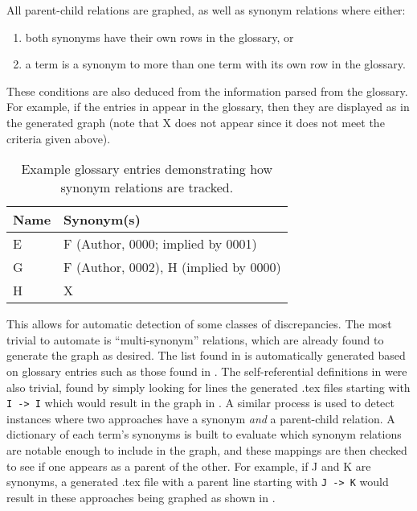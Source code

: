 {        \ExampleGraph{}

    \fi
    All parent-child relations are graphed, as well as synonym relations where either:
    \begin{enumerate}
        \item both synonyms have their own rows in the glossary, or
        \item a term is a synonym to more than one term with its own row in the
              glossary.
    \end{enumerate}
    \ifnotpaper These conditions are also deduced from the information parsed
        from the glossary. For example, if the entries in 
        appear in the glossary, then they are displayed as 
        in the generated graph (note that X does not appear since it does not
        meet the criteria given above).

        \begin{table}[hbtp!]
            \centering
            \begin{tabular}{ll} \hline
                Name & Synonym(s)                            \\ \hline
                E    & F (Author, 0000; implied by 0001)     \\
                G    & F (Author, 0002), H (implied by 0000) \\
                H    & X                                     \\ \hline
            \end{tabular}
            \caption{Example glossary entries demonstrating how synonym relations are tracked.}
            \label{tab:synExampleGlossary}
        \end{table}

        This allows for automatic detection of some classes of discrepancies. The
        most trivial to automate is ``multi-synonym'' relations, which are already
        found to generate the graph as desired. The list found in 
        is automatically generated based on glossary entries such as those found
        in . The self-referential definitions in
         were also trivial, found by simply looking for lines
        the generated .tex files starting with \texttt{I -> I} which would
        result in the graph in . A similar process
        is used to detect instances where two approaches have a synonym
        \emph{and} a parent-child relation. A dictionary of each term's
        synonyms is built to evaluate which synonym relations are notable
        enough to include in the graph, and these mappings are then checked to
        see if one appears as a parent of the other. For example, if J and K
        are synonyms, a generated .tex file with a parent line starting with
        \texttt{J -> K} would result in these approaches being graphed as shown
        in .

}
